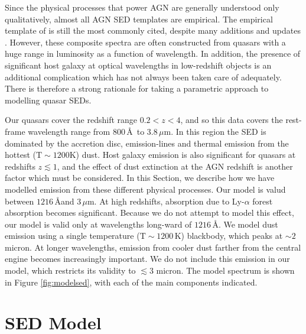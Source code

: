 Since the physical processes that power AGN are generally understood only qualitatively, almost all AGN SED templates are empirical. 
The empirical template of \citet{elvis94} is still the most commonly cited, despite many additions and updates \citep[e.g.][]{polletta00, kuraszkiewicz03, risaliti04, richards06,  polletta07, lusso10, shang11, marchese12, trichas12}. 
However, these composite spectra are often constructed from quasars with a huge range in luminosity as a function of wavelength. 
In addition, the presence of significant host galaxy at optical wavelengths in low-redshift objects is an additional complication which has not always been taken care of adequately. 
There is therefore a strong rationale for taking a parametric approach to modelling quasar SEDs. 

Our quasars cover the redshift range $0.2 < z < 4$, and so this data covers the rest-frame wavelength range from $800$\,\AA\, to $3.8$\,$\mu$m. 
In this region the SED is dominated by the accretion disc, emission-lines and thermal emission from the hottest (${\mathrm T}\sim1200$K) dust. 
Host galaxy emission is also significant for quasars at redshifts $z\lesssim1$, and the effect of dust extinction at the AGN redshift is another factor which must be considered.   
In this Section, we describe how we have modelled emission from these different physical processes.
Our model is valud between $1216$\,\AA and $3$\,$\mu$m.
At high redshifts, absorption due to Ly-$\alpha$ forest absorption becomes significant. 
Because we do not attempt to model this effect, our model is valid only at wavelengths long-ward of $1216$\,\AA. 
We model dust emission using a single temperature (${\mathrm T}\sim1200$\,K) blackbody, which peaks at $\sim2$ micron. 
At longer wavelengths, emission from cooler dust farther from the central engine becomes increasingly important. 
We do not include this emission in our model, which restricts its validity to $\lesssim3$ micron.
The model spectrum is shown in Figure \ref{fig:modelsed}, with each of the main components indicated. 

\section{SED Model}

